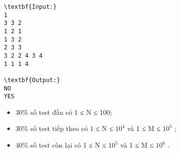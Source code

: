\begin{verbatim}
\textbf{Input:}
1
3 3 2
1 2 1
1 3 2
2 3 3
3 2 2 4 3 4
1 1 1 4

\textbf{Output:}
NO
YES\end{verbatim}
\begin{itemize}
	\item 30\% số test đầu có 1 ≤ N ≤ 100;
	\item 30\% số test tiếp theo có 1 ≤ N ≤ $10^{4}$ và 1 ≤ M ≤ $10^{5}$ ;
	\item 40\% số test còn lại có 1 ≤ N ≤ $10^{5}$ và 1 ≤ M ≤ $10^{6}$ .
\end{itemize}